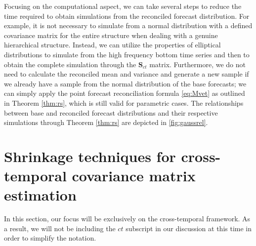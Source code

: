 \documentclass[a4paper,11pt]{article}
\newcommand{\Svet}{\bm{S}}
\theoremstyle{definition}
\begin{document}


Focusing on the computational aspect, we can take several steps to reduce the time required to obtain simulations from the reconciled forecast distribution. For example, it is not necessary to simulate from a normal distribution with a defined covariance matrix for the entire structure when dealing with a genuine hierarchical structure. Instead, we can utilize the properties of elliptical distributions to simulate from the high frequency bottom time series and then to obtain the complete simulation through the $\Svet_{ct}$ matrix. Furthermore, we do not need to calculate the reconciled mean and variance and generate a new sample if we already have a sample from the normal distribution of the base forecasts; we can simply apply the point forecast reconciliation formula \eqref{eq:Mvet} as outlined in Theorem \ref{thm:rs}, which is still valid for parametric cases. The relationships between base and reconciled forecast distributions and their respective simulations through Theorem \ref{thm:rs} are depicted in \autoref{fig:gaussrel}.


\section{Shrinkage techniques for cross-temporal covariance matrix estimation}\label{sec:shrtech}

In this section, our focus will be exclusively on the cross-temporal framework. As a result, we will not be including the $ct$ subscript in our discussion at this time in order to simplify the notation.
\end{document}
